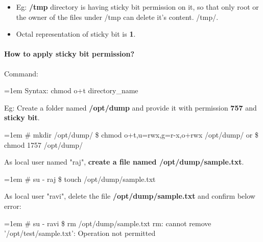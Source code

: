 \begin{flushleft}
\begin{itemize}
		\item Eg: \textbf{/tmp} directory is having sticky bit permission on it, so that only root or the owner of the files under /tmp can delete it's content.
		/tmp/.
		\item Octal representation of sticky bit is \textbf{1}.	
	\end{itemize}
\newpage

\paragraph{How to apply sticky bit permission?}
\bigskip
Command:
\begin{tcolorbox}[breakable,notitle,boxrule=0pt,colback=pink,colframe=pink]
	\color{black}
	\font=1em
	Syntax: chmod o+t directory\_name
	\font=4pt
\end{tcolorbox}
Eg: Create a folder named \textbf{/opt/dump} and provide it with permission \textbf{757} and \textbf{sticky bit}.
\begin{tcolorbox}[breakable,notitle,boxrule=-0pt,colback=black,colframe=black]
	\color{green}
	\font=1em
	\# mkdir /opt/dump/
	\newline
	\$ chmod o+t,u=rwx,g=r-x,o+rwx /opt/dump/
	\newline
	or
	\newline
	\$ chmod 1757 /opt/dump/
	\font=4pt
\end{tcolorbox}
As local user named "raj", \textbf{create a file named /opt/dump/sample.txt}.
\begin{tcolorbox}[breakable,notitle,boxrule=-0pt,colback=black,colframe=black]
	\color{green}
	\font=1em
	\# su - raj
	\newline
	\$ touch /opt/dump/sample.txt
	\font=4pt
\end{tcolorbox}

As local user "ravi", delete the file \textbf{/opt/dump/sample.txt} and confirm below error:
\begin{tcolorbox}[breakable,notitle,boxrule=-0pt,colback=black,colframe=black]
	\color{green}
	\font=1em
	\# su - ravi
	\newline
	\$ rm /opt/dump/sample.txt
	\color{white}
	\newline
	rm: cannot remove '/opt/test/sample.txt': Operation not permitted
	\font=4pt
\end{tcolorbox}

\newpage

\end{flushleft}
